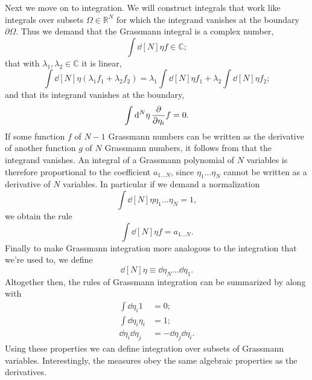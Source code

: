 Next we move on to integration. We will construct integrals that work like
integrals over subsets $\Omega\in\mathbb{R}^N$ for which 
the integrand vanishes at the boundary $\partial\Omega$. 
Thus we demand that the Grassmann integral is a complex number,
\begin{equation}
  \int\dd[N]{\eta}f\in\mathbb{C};
\end{equation}
that with $\lambda_1,\lambda_2\in\mathbb{C}$ it is linear,
\begin{equation}\label{eq:grasslin}
  \int\dd[N]{\eta}\left(\lambda_1f_1+\lambda_2f_2\right)
       =\lambda_1\int\dd[N]{\eta}f_1
         +\lambda_2\int\dd[N]{\eta}f_2;
\end{equation}
and that its integrand vanishes at the boundary,
\begin{equation}\label{eq:grassBC}
  \int\dd[N]{\eta}\pdv{\eta_i}f=0.
\end{equation}
If some function $f$ of $N-1$ Grassmann numbers can be written as the 
derivative of another function $g$ of $N$ Grassmann numbers, it follows
from  that the integrand vanishes.
An integral of a Grassmann polynomial of $N$ variables is therefore
proportional to the coefficient $a_{1...N}$, since
$\eta_1...\eta_N$ cannot be written as a derivative of $N$ variables.
In particular if we demand a normalization
\begin{equation}\label{eq:grassnorm}
  \int\dd[N]{\eta}\eta_1...\eta_N=1,
\end{equation}
we obtain the rule
\begin{equation}
  \int\dd[N]{\eta}f=a_{1...N}.
\end{equation}
Finally to make Grassmann integration more analogous to the integration that
we're used to, we define
\begin{equation}
  \dd[N]{\eta}\equiv\dd{\eta_N}...\dd{\eta_1}.
\end{equation}
Altogether then, the rules of Grassmann integration can be summarized by
 along with
\begin{equation}\label{eq:grassintrules}\begin{aligned}
       \int\dd{\eta_i}1&=0;\\
  \int\dd{\eta_i}\eta_i&=1;\\
  \dd{\eta_i}\dd{\eta_j}&=-\dd{\eta_j}\dd{\eta_i}.
\end{aligned}\end{equation}
Using these properties we can define integration over subsets of Grassmann
variables. Interestingly, the measures obey the same algebraic properties as
the derivatives.

